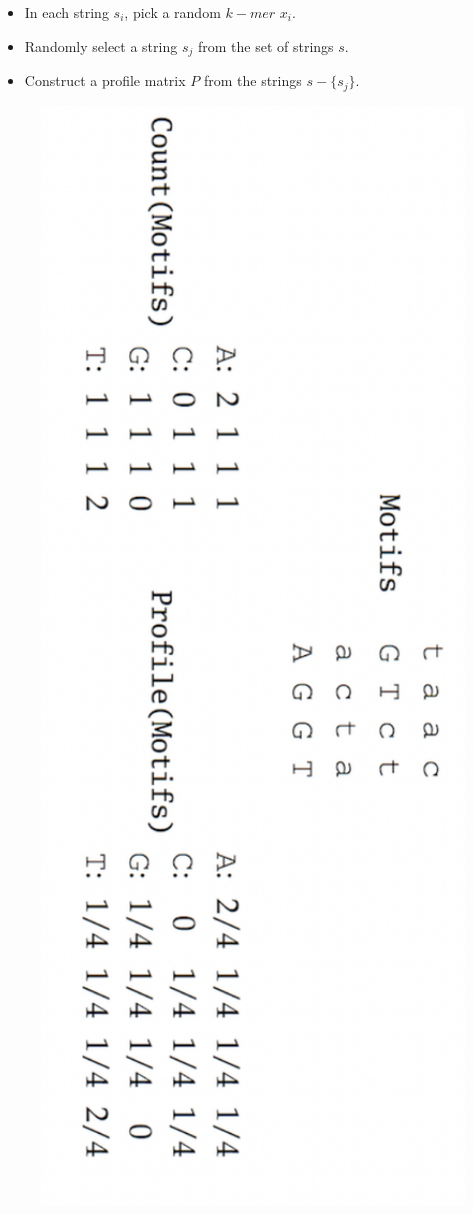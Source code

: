 \documentclass[12pt]{scrartcl} %
\begin{document}
\begin{itemize}
    \item In each string $s_i$, pick a random $k-mer$ $x_i$.
    \item Randomly select a string $s_j$ from the set of strings $s$.
    \item Construct a profile matrix $P$ from the strings $s - \{s_j\}$.
    \begin{center}
        \includegraphics[width=0.95\textwidth]{Profile_m.png}

\end{center}
\end{itemize}
\end{document}
